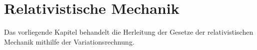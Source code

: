 %
%
%
%
\chapter{Relativistische Mechanik\label{chapter:relativ}}
\begin{refsection}

Das vorliegende Kapitel behandelt die Herleitung der Gesetze der relativistischen Mechanik
mithilfe der Variationsrechnung.






\printbibliography[heading=subbibliography]
\end{refsection}
